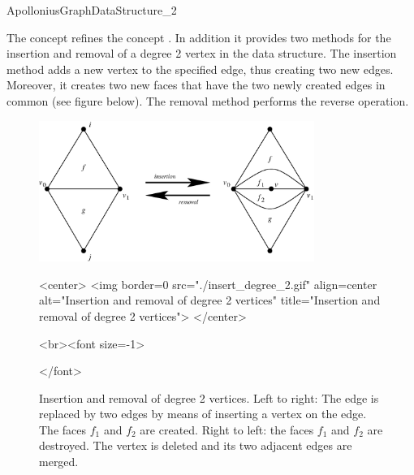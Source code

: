 

\begin{ccRefConcept}{ApolloniusGraphDataStructure_2}

\ccDefinition

The concept  refines the concept
. In addition
it provides two methods for the insertion and removal of a degree 2
vertex in the data structure. The insertion method adds a new vertex
to the specified edge, thus creating two new edges. Moreover, it
creates two new faces that have the two newly created edges in
common (see figure below). The removal method performs the reverse
operation.

\begin{figure}[htb]%
\begin{ccTexOnly}
\begin{center}
\includegraphics[width=0.8\textwidth]
{Apollonius_graph_2_ref/insert_degree_2.eps}
\end{center}
\end{ccTexOnly}
\begin{ccHtmlOnly}
<center>
<img border=0 src="./insert_degree_2.gif" align=center
alt="Insertion and removal of degree 2 vertices"
title="Insertion and removal of degree 2 vertices">
</center>
\end{ccHtmlOnly}
\begin{ccHtmlOnly}
<br><font size=-1>
\end{ccHtmlOnly}
\caption{Insertion and removal of degree 2 vertices. Left to right:
The edge  is replaced by two edges by means of inserting a
vertex  on the edge. The faces $f_1$ and $f_2$ are
created. Right to left: the faces $f_1$ and $f_2$ are
destroyed. The vertex  is deleted and its two adjacent edges
are merged.}
\begin{ccHtmlOnly}
</font>
\end{ccHtmlOnly}
\end{figure}




\end{ccRefConcept}
